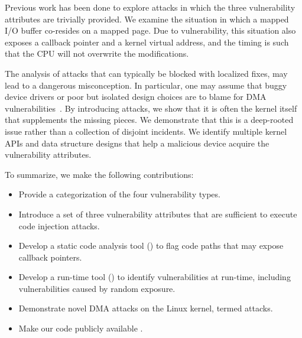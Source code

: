 Previous work has been done to explore \simple{} attacks  in which the three vulnerability attributes are trivially provided. We examine the situation in which a mapped I/O buffer co-resides on a mapped page. Due to \subpage{} vulnerability, this situation also exposes a callback pointer and a kernel virtual address, and the timing is such that the CPU will not overwrite the modifications.

The analysis of \simple{} attacks that can typically be blocked with localized fixes, may lead to a dangerous misconception. In particular, one may assume that buggy device drivers or poor but isolated design choices are to blame for DMA vulnerabilities~\cite{malka2015efficient,malka2015riommu}.
By introducing \compound attacks, we show that it is often the kernel itself that supplements the missing pieces. We demonstrate that this is a deep-rooted issue rather than a collection of disjoint incidents.
We identify multiple kernel APIs and data structure designs that help a malicious device acquire the vulnerability attributes.


To summarize, we make the following contributions:
\begin{itemize}
    \item Provide a categorization of the four \subpage{} vulnerability types.
    \item Introduce a set of three vulnerability attributes that are sufficient to execute code injection attacks.
    \item Develop a static code analysis tool (\tool) to flag code paths that may expose callback pointers. 
    \item Develop a run-time tool (\dkasan) to identify \subpage{} vulnerabilities at run-time, including vulnerabilities caused by random exposure.
    \item Demonstrate novel DMA attacks on the Linux kernel, termed \compound{} attacks.
    \item Make our code publicly available \cite{DKASAN,SPADE}.
\end{itemize}

